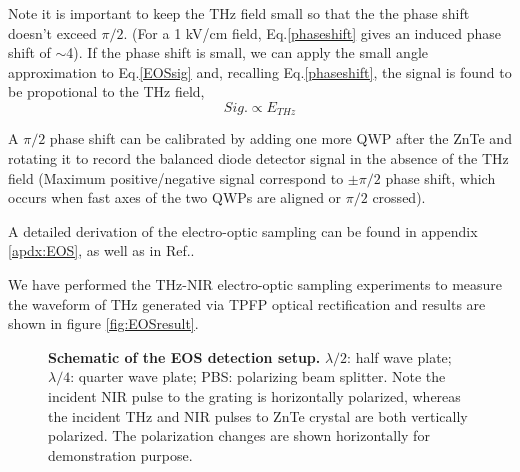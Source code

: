 Note it is important to keep the THz field small so that the the phase shift doesn't exceed $\pi/2$. (For a 1 kV/cm field, Eq.\@ \ref{phaseshift} gives an induced phase shift of $\sim$4\degree). If the phase shift is small, we can apply the small angle approximation to Eq.\@ \ref{EOSsig} and, recalling Eq.\@ \ref{phaseshift}, the signal is found to be propotional to the THz field,
\begin{equation}
    Sig. \propto E_{THz}
\end{equation}

A $\pi/2$ phase shift can be calibrated by adding one more QWP after the ZnTe and rotating it to record the balanced diode detector signal in the absence of the THz field (Maximum positive/negative signal correspond to $\pm \pi/2$ phase shift, which occurs when fast axes of the two QWPs are aligned or $\pi/2$ crossed).

A detailed derivation of the electro-optic sampling can be found in appendix \ref{apdx:EOS}, as well as in Ref.\@ \cite{WinterthesisEOS}.

We have performed the THz-NIR electro-optic sampling experiments to measure the waveform of THz generated via TPFP optical rectification and results are shown in figure \ref{fig:EOSresult}.

\begin{figure}[H]
	
	\centering
	\caption[Schematic of the electro-optic sampling detection setup.]{{\bf Schematic of the EOS detection setup.} $\lambda/2$: half wave plate; $\lambda/4$: quarter wave plate; PBS: polarizing beam splitter. Note the incident NIR pulse to the grating is horizontally polarized, whereas the incident THz and NIR pulses to ZnTe crystal are both vertically polarized. The polarization changes are shown horizontally for demonstration purpose.}
	\label{fig:EOSsetup}
	
\end{figure}


